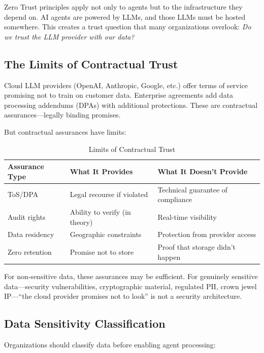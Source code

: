 Zero Trust principles apply not only to agents but to the infrastructure they depend on. AI agents are powered by LLMs, and those LLMs must be hosted somewhere. This creates a trust question that many organizations overlook: \textit{Do we trust the LLM provider with our data?}

\subsection{The Limits of Contractual Trust}
\label{subsec:contractual-limits}

Cloud LLM providers (OpenAI, Anthropic, Google, etc.) offer terms of service promising not to train on customer data. Enterprise agreements add data processing addendums (DPAs) with additional protections. These are contractual assurances---legally binding promises.

But contractual assurances have limits:

\begin{table}[htbp]
\centering
\caption{Limits of Contractual Trust}
\label{tab:contractual-limits}
\begin{tabular}{lll}
\toprule
\textbf{Assurance Type} & \textbf{What It Provides} & \textbf{What It Doesn't Provide} \\
\midrule
ToS/DPA & Legal recourse if violated & Technical guarantee of compliance \\
Audit rights & Ability to verify (in theory) & Real-time visibility \\
Data residency & Geographic constraints & Protection from provider access \\
Zero retention & Promise not to store & Proof that storage didn't happen \\
\bottomrule
\end{tabular}
\end{table}

For non-sensitive data, these assurances may be sufficient. For genuinely sensitive data---security vulnerabilities, cryptographic material, regulated PII, crown jewel IP---``the cloud provider promises not to look'' is not a security architecture.

\subsection{Data Sensitivity Classification}
\label{subsec:data-classification}

Organizations should classify data before enabling agent processing:

